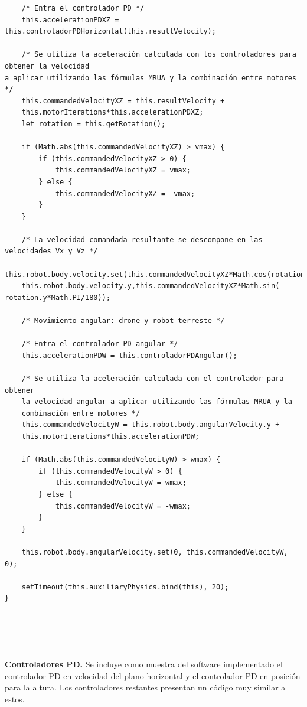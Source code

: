 {\begin{verbatim}
	/* Entra el controlador PD */
	this.accelerationPDXZ = this.controladorPDHorizontal(this.resultVelocity); 
	
	/* Se utiliza la aceleración calculada con los controladores para obtener la velocidad 
a aplicar utilizando las fórmulas MRUA y la combinación entre motores */
	this.commandedVelocityXZ = this.resultVelocity + 
	this.motorIterations*this.accelerationPDXZ;
	let rotation = this.getRotation();
	
	if (Math.abs(this.commandedVelocityXZ) > vmax) {
    	if (this.commandedVelocityXZ > 0) {
    	    this.commandedVelocityXZ = vmax;
    	} else {
    	    this.commandedVelocityXZ = -vmax;
        }
    }	
	
	/* La velocidad comandada resultante se descompone en las velocidades Vx y Vz */
	this.robot.body.velocity.set(this.commandedVelocityXZ*Math.cos(rotation.y*Math.PI/180), 
	this.robot.body.velocity.y,this.commandedVelocityXZ*Math.sin(-rotation.y*Math.PI/180));
	
    /* Movimiento angular: drone y robot terreste */
    
    /* Entra el controlador PD angular */              
    this.accelerationPDW = this.controladorPDAngular();
    
    /* Se utiliza la aceleración calculada con el controlador para obtener 
    la velocidad angular a aplicar utilizando las fórmulas MRUA y la 
    combinación entre motores */
    this.commandedVelocityW = this.robot.body.angularVelocity.y + 
    this.motorIterations*this.accelerationPDW;

    if (Math.abs(this.commandedVelocityW) > wmax) {
    	if (this.commandedVelocityW > 0) {
    	    this.commandedVelocityW = wmax;
        } else {
            this.commandedVelocityW = -wmax;
        }
    }     
    
    this.robot.body.angularVelocity.set(0, this.commandedVelocityW, 0);
    
    setTimeout(this.auxiliaryPhysics.bind(this), 20);
}





\end{verbatim}
}
\normalsize
\textbf{Controladores PD.} Se incluye como muestra del software implementado el controlador PD en velocidad del plano horizontal y el controlador PD en posición para la altura. Los controladores restantes presentan un código muy similar a estos.

